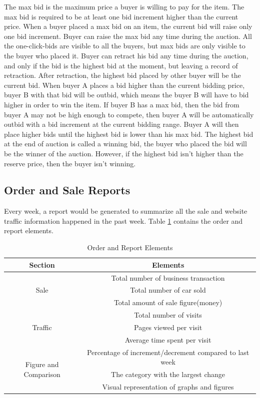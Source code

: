 \documentclass[12pt]{article}
\begin{document}
\par The max bid is the maximum price a buyer is willing to pay for the item. The max bid is required to be at least one bid increment higher than the current price. When a buyer placed a max bid on an item, the current bid will raise only one bid increment. Buyer can raise the max bid any time during the auction. All the one-click-bids are visible to all the buyers, but max bids are only visible to the buyer who placed it. Buyer can retract his bid any time during the auction, and only if the bid is the highest bid at the moment, but leaving a record of retraction. After retraction, the highest bid placed by other buyer will be the current bid. When buyer A places a bid higher than the current bidding price, buyer B with that bid will be outbid, which means the buyer B will have to bid higher in order to win the item. If buyer B has a max bid, then the bid from buyer A may not be high enough to compete, then buyer A will be automatically outbid with a bid increment at the current bidding range. Buyer A will then place higher bids until the highest bid is lower than his max bid. The highest bid at the end of auction is called a winning bid, the buyer who placed the bid will be the winner of the auction. However, if the highest bid isn't higher than the reserve price, then the buyer isn't winning.

\subsection{Order and Sale Reports}
Every week, a report would be generated to summarize all the sale and website traffic information happened in the past week. Table \ref{report_element} contains the order and report elements.
\begin{table}[!h]
\caption{Order and Report Elements}\label{report_element}
\begin{center}
\begin{tabular}{|c|c|}
\hline
Section & Elements\\ \hline
\multirow{3}{*}{Sale} & Total number of business transaction\\
& Total number of car sold\\
& Total amount of sale figure(money)\\ \hline
\multirow{3}{*}{Traffic} & Total number of visits\\
& Pages viewed per visit\\
& Average time spent per visit\\ \hline
\multirow{3}{*}{Figure and Comparison} & 	Percentage of increment/decrement compared to last week\\
& The category with the largest change\\
& Visual representation of graphs and figures \\ \hline
\end{tabular}
\end{center}
\end{table}
\end{document}
